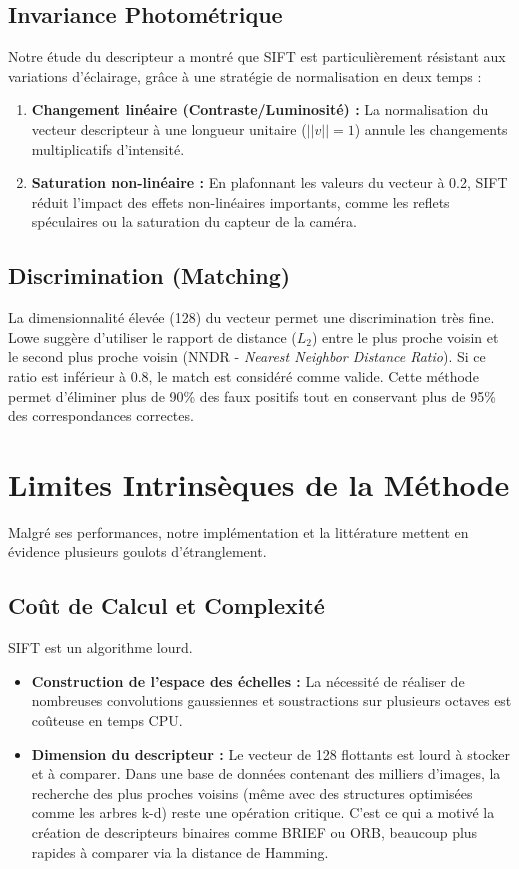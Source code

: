 \documentclass[a4paper,12pt]{report}
\begin{document}
\subsection{Invariance Photométrique}
Notre étude du descripteur a montré que SIFT est particulièrement résistant aux variations d'éclairage, grâce à une stratégie de normalisation en deux temps :
\begin{enumerate}
    \item \textbf{Changement linéaire (Contraste/Luminosité) :} La normalisation du vecteur descripteur à une longueur unitaire ($||v||=1$) annule les changements multiplicatifs d'intensité.
    \item \textbf{Saturation non-linéaire :} En plafonnant les valeurs du vecteur à 0.2, SIFT réduit l'impact des effets non-linéaires importants, comme les reflets spéculaires ou la saturation du capteur de la caméra.
\end{enumerate}

\subsection{Discrimination (Matching)}
La dimensionnalité élevée (128) du vecteur permet une discrimination très fine. Lowe suggère d'utiliser le rapport de distance ($L_2$) entre le plus proche voisin et le second plus proche voisin (NNDR - \textit{Nearest Neighbor Distance Ratio}). Si ce ratio est inférieur à 0.8, le match est considéré comme valide. Cette méthode permet d'éliminer plus de 90\% des faux positifs tout en conservant plus de 95\% des correspondances correctes.

\section{Limites Intrinsèques de la Méthode}

Malgré ses performances, notre implémentation et la littérature mettent en évidence plusieurs goulots d'étranglement.

\subsection{Coût de Calcul et Complexité}
SIFT est un algorithme lourd.
\begin{itemize}
    \item \textbf{Construction de l'espace des échelles :} La nécessité de réaliser de nombreuses convolutions gaussiennes et soustractions sur plusieurs octaves est coûteuse en temps CPU.
    \item \textbf{Dimension du descripteur :} Le vecteur de 128 flottants est lourd à stocker et à comparer. Dans une base de données contenant des milliers d'images, la recherche des plus proches voisins (même avec des structures optimisées comme les arbres k-d) reste une opération critique. C'est ce qui a motivé la création de descripteurs binaires comme BRIEF ou ORB, beaucoup plus rapides à comparer via la distance de Hamming.
\end{itemize}
\end{document}
